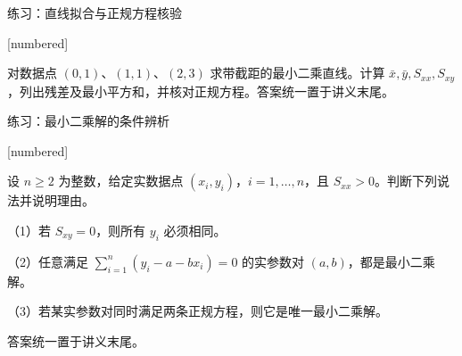 \documentclass[aspectratio=169,10pt,fontset=fandol]{ctexbeamer}
\makeatletter
\newcommand{\mathagentexerciselabelcontext}[1]{%
\hypertarget<1>{#1}{}%
\edef\@currentHref{#1}%
}
\makeatother
\begin{document}
\begin{frame}[t,fragile]{练习：直线拟合与正规方程核验}
\normalsize
{\normalsize
[numbered]
\mathagentexerciselabelcontext{mathagent.exercise.U0028.0}
\begin{exercise}
\label{mathagent:exercise:332ae2e99c79cf97370ba4732967ff23f2a2c4a4b36b98eda8e910755bf43b8b}
对数据点 $(0,1)$、$(1,1)$、$(2,3)$ 求带截距的最小二乘直线。计算 $\bar{x},\bar{y},S_{xx},S_{xy}$，列出残差及最小平方和，并核对正规方程。答案统一置于讲义末尾。
\end{exercise}
}
\end{frame}
\begin{frame}[t,fragile]{练习：最小二乘解的条件辨析}
\normalsize
{\normalsize
[numbered]
\mathagentexerciselabelcontext{mathagent.exercise.U0029.0}
\begin{exercise}
\label{mathagent:exercise:b4c9c9a1fb82bcef052fdbf6e1539831ed88cee016dbcbf83a50e5e8d2311be0}
设 $n\geq2$ 为整数，给定实数据点 $(x_i,y_i)$，$i=1,\ldots,n$，且 $S_{xx}>0$。判断下列说法并说明理由。

（1）若 $S_{xy}=0$，则所有 $y_i$ 必须相同。

（2）任意满足 $\sum_{i=1}^{n}(y_i-a-bx_i)=0$ 的实参数对 $(a,b)$，都是最小二乘解。

（3）若某实参数对同时满足两条正规方程，则它是唯一最小二乘解。

答案统一置于讲义末尾。
\end{exercise}
}
\end{frame}
\end{document}

